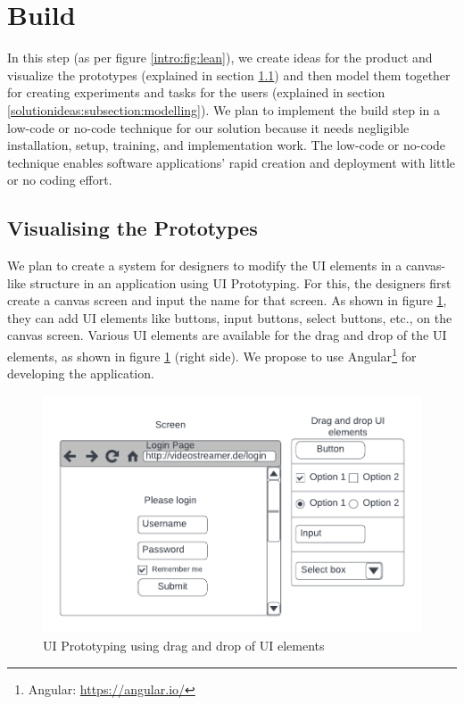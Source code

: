 \section{Build}
In this step (as per figure \ref{intro:fig:lean}), we create ideas for the product and visualize the prototypes (explained in section \ref{solutionideas:subsection:visualize}) and then model them together for creating experiments and tasks for the users (explained in section \ref{solutionideas:subsection:modelling}).
We plan to implement the build step in a low-code or no-code technique for our solution because it needs negligible installation, setup, training, and implementation work.
The low-code or no-code technique enables software applications' rapid creation and deployment with little or no coding effort.

\subsection{Visualising the Prototypes}
\label{solutionideas:subsection:visualize}

We plan to create a system for designers to modify the UI elements in a canvas-like structure in an application using UI Prototyping.
For this, the designers first create a canvas screen and input the name for that screen.
As shown in figure \ref{solutionideas:fig:uiprototyping}, they can add UI elements like buttons, input buttons, select buttons, etc., on the canvas screen.
Various UI elements are available for the drag and drop of the UI elements, as shown in figure \ref{solutionideas:fig:uiprototyping} (right side).
We propose to use Angular\footnote{Angular: \url{https://angular.io/}} for developing the application.

\begin{figure}[h]
    \centering
    \includegraphics[scale=0.4]{images/solution-ideas/UIPrototyping.png}
    \caption{UI Prototyping using drag and drop of UI elements}
    \label{solutionideas:fig:uiprototyping}
\end{figure}

